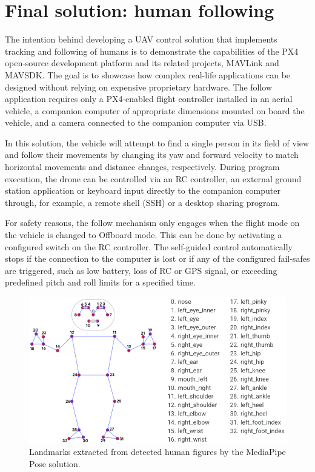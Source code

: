 \section{Final solution: human following}
\label{sec:follow}

The intention behind developing a UAV control solution that implements tracking and following of humans is to demonstrate the capabilities of the PX4 open-source development platform and its related projects, MAVLink and MAVSDK. The goal is to showcase how complex real-life applications can be designed without relying on expensive proprietary hardware. The follow application requires only a PX4-enabled flight controller installed in an aerial vehicle, a companion computer of appropriate dimensions mounted on board the vehicle, and a camera connected to the companion computer via USB.

In this solution, the vehicle will attempt to find a single person in its field of view and follow their movements by changing its yaw and forward velocity to match horizontal movements and distance changes, respectively.
During program execution, the drone can be controlled via an RC controller, an external ground station application or keyboard input directly to the companion computer through, for example, a remote shell (SSH) or a desktop sharing program.

For safety reasons, the follow mechanism only engages when the flight mode on the vehicle is changed to Offboard mode. This can be done by activating a configured switch on the RC controller. The self-guided control automatically stops if the connection to the computer is lost or if any of the configured fail-safes are triggered, such as low battery, loss of RC or GPS signal, or exceeding predefined pitch and roll limits for a specified time.

\begin{figure}
  \centering
  \includegraphics[width=\textwidth, keepaspectratio]{img/pose-landmarks.png}
  \caption{Landmarks extracted from detected human figures by the MediaPipe Pose solution.}
  \label{fig:pose-landmarks}
\end{figure}

